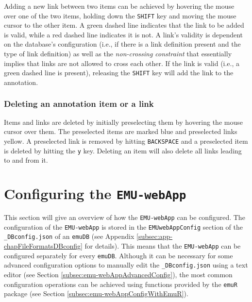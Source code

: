 \documentclass[]{book}
\theoremstyle{definition}
\theoremstyle{definition}
\theoremstyle{definition}
\theoremstyle{remark}
\begin{document}
Adding a new link between two items can be achieved by hovering the
mouse over one of the two items, holding down the \texttt{SHIFT} key and
moving the mouse cursor to the other item. A green dashed line indicates
that the link to be added is valid, while a red dashed line indicates it
is not. A link's validity is dependent on the database's configuration
(i.e., if there is a link definition present and the type of link
definition) as well as the \emph{non-crossing constraint}
\citep{coleman:lp1991a} that essentially implies that links are not
allowed to cross each other. If the link is valid (i.e., a green dashed
line is present), releasing the \texttt{SHIFT} key will add the link to
the annotation.

\hypertarget{deleting-an-annotation-item-or-a-link}{%
\subsubsection{Deleting an annotation item or a
link}\label{deleting-an-annotation-item-or-a-link}}

Items and links are deleted by initially preselecting them by hovering
the mouse cursor over them. The preselected items are marked blue and
preselected links yellow. A preselected link is removed by hitting
\texttt{BACKSPACE} and a preselected item is deleted by hitting the
\texttt{y} key. Deleting an item will also delete all links leading to
and from it.

\hypertarget{configuring-the-emu-webapp}{%
\section{\texorpdfstring{Configuring the
\texttt{EMU-webApp}}{Configuring the EMU-webApp}}\label{configuring-the-emu-webapp}}

This section will give an overview of how the \texttt{EMU-webApp} can be
configured. The configuration of the \texttt{EMU-webApp} is stored in
the \texttt{EMUwebAppConfig} section of the \texttt{\_DBconfig.json} of
an \texttt{emuDB} (see Appendix \ref{subsec:app-chapFileFormatsDBconfig}
for details). This means that the \texttt{EMU-webApp} can be configured
separately for every \texttt{emuDB}. Although it can be necessary for
some advanced configuration options to manually edit the
\texttt{\_DBconfig.json} using a text editor (see Section
\ref{subsec:emu-webAppAdvancedConfig}), the most common configuration
operations can be achieved using functions provided by the \texttt{emuR}
package (see Section \ref{subsec:emu-webAppConfigWithEmuR}).
\end{document}
